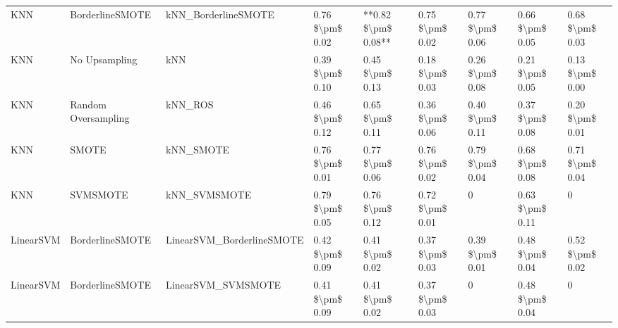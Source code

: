 \begin{tabular}{lllllllll}
                            KNN &               BorderlineSMOTE &                          kNN\_BorderlineSMOTE & 0.76 \$\textbackslash pm\$ 0.02 &       **0.82 \$\textbackslash pm\$ 0.08** &       0.75 \$\textbackslash pm\$ 0.02 &        0.77 \$\textbackslash pm\$ 0.06 &                         0.66 \$\textbackslash pm\$ 0.05 & 0.68 \$\textbackslash pm\$ 0.03 \\
                            KNN &                 No Upsampling &                                          kNN & 0.39 \$\textbackslash pm\$ 0.10 &           0.45 \$\textbackslash pm\$ 0.13 &       0.18 \$\textbackslash pm\$ 0.03 &        0.26 \$\textbackslash pm\$ 0.08 &                         0.21 \$\textbackslash pm\$ 0.05 & 0.13 \$\textbackslash pm\$ 0.00 \\
                            KNN &           Random Oversampling &                                      kNN\_ROS & 0.46 \$\textbackslash pm\$ 0.12 &           0.65 \$\textbackslash pm\$ 0.11 &       0.36 \$\textbackslash pm\$ 0.06 &        0.40 \$\textbackslash pm\$ 0.11 &                         0.37 \$\textbackslash pm\$ 0.08 & 0.20 \$\textbackslash pm\$ 0.01 \\
                            KNN &                         SMOTE &                                    kNN\_SMOTE & 0.76 \$\textbackslash pm\$ 0.01 &           0.77 \$\textbackslash pm\$ 0.06 &       0.76 \$\textbackslash pm\$ 0.02 &        0.79 \$\textbackslash pm\$ 0.04 &                         0.68 \$\textbackslash pm\$ 0.08 & 0.71 \$\textbackslash pm\$ 0.04 \\
                            KNN &                      SVMSMOTE &                                 kNN\_SVMSMOTE & 0.79 \$\textbackslash pm\$ 0.05 &           0.76 \$\textbackslash pm\$ 0.12 &       0.72 \$\textbackslash pm\$ 0.01 &                      0 &                         0.63 \$\textbackslash pm\$ 0.11 &               0 \\
                      LinearSVM &               BorderlineSMOTE &                    LinearSVM\_BorderlineSMOTE & 0.42 \$\textbackslash pm\$ 0.09 &           0.41 \$\textbackslash pm\$ 0.02 &       0.37 \$\textbackslash pm\$ 0.03 &        0.39 \$\textbackslash pm\$ 0.01 &                         0.48 \$\textbackslash pm\$ 0.04 & 0.52 \$\textbackslash pm\$ 0.02 \\
                      LinearSVM &               BorderlineSMOTE &                           LinearSVM\_SVMSMOTE & 0.41 \$\textbackslash pm\$ 0.09 &           0.41 \$\textbackslash pm\$ 0.02 &       0.37 \$\textbackslash pm\$ 0.03 &                      0 &                         0.48 \$\textbackslash pm\$ 0.04 &               0 \\

\end{tabular}
